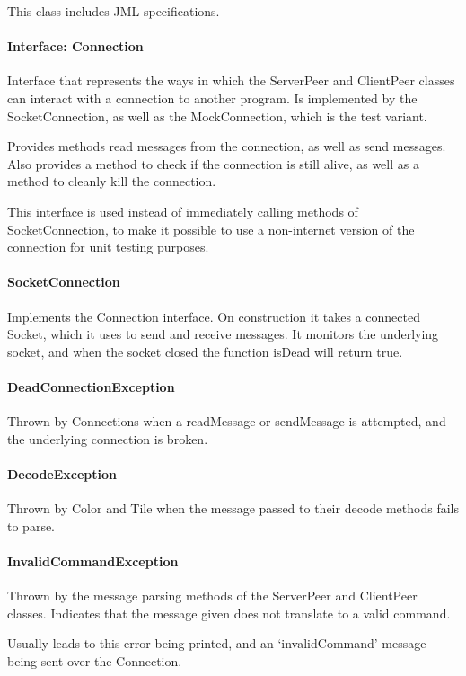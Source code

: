 \documentclass[12pt, letterpaper]{article}
\begin{document}
    This class includes JML specifications.

    \paragraph{Interface: Connection}
    Interface that represents the ways in which the ServerPeer and ClientPeer classes can interact with a connection to
    another program.
    Is implemented by the SocketConnection, as well as the MockConnection, which is the test variant.

    Provides methods read messages from the connection, as well as send messages.
    Also provides a method to check if the connection is still alive, as well as a method to
    cleanly kill the connection.

    This interface is used instead of immediately calling methods of SocketConnection, to make it possible to use
    a non-internet version of the connection for unit testing purposes.

    \paragraph{SocketConnection}
    Implements the Connection interface.
    On construction it takes a connected Socket, which it uses to send and receive messages.
    It monitors the underlying socket, and when the socket closed the function isDead will return true.


    \paragraph{DeadConnectionException}
    Thrown by Connections when a readMessage or sendMessage is attempted, and the underlying connection is broken.

    \paragraph{DecodeException}
    Thrown by Color and Tile when the message passed to their decode methods fails to parse.

    \paragraph{InvalidCommandException}
    Thrown by the message parsing methods of the ServerPeer and ClientPeer classes.
    Indicates that the message given does not translate to a valid command.

    Usually leads to this error being printed, and an `invalidCommand' message being sent over the Connection.
\end{document}
